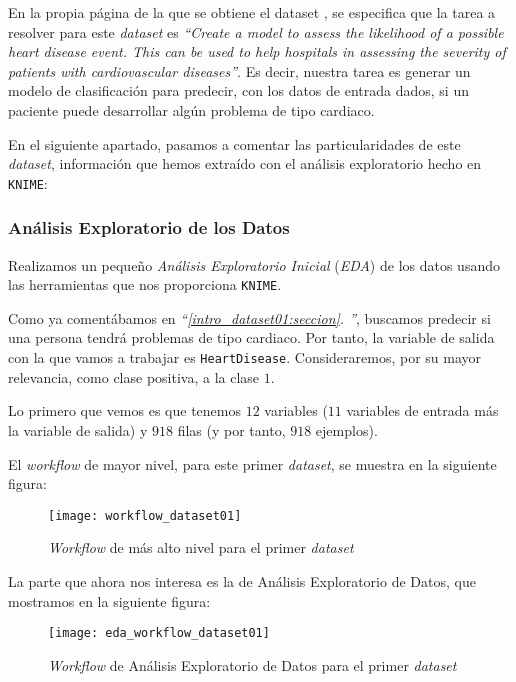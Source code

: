 \documentclass[11pt]{article}
\newcommand{\customcite}[1]{\emph{``\ref{#1}. \nameref{#1}''}}
\begin{document}
En la propia página de la que se obtiene el dataset \cite{heart_disease_dataset:online}, se especifica que la tarea a resolver para este \emph{dataset} es \emph{``Create a model to assess the likelihood of a possible heart disease event. This can be used to help hospitals in assessing the severity of patients with cardiovascular diseases''}. Es decir, nuestra tarea es generar un modelo de clasificación para predecir, con los datos de entrada dados, si un paciente puede desarrollar algún problema de tipo cardiaco.

En el siguiente apartado, pasamos a comentar las particularidades de este \emph{dataset}, información que hemos extraído con el análisis exploratorio hecho en \lstinline{KNIME}:

\subsubsection{Análisis Exploratorio de los Datos}

Realizamos un pequeño \emph{Análisis Exploratorio Inicial} (\emph{EDA}) de los datos usando las herramientas que nos proporciona \lstinline{KNIME}.

Como ya comentábamos en \customcite{intro_dataset01:seccion}, buscamos predecir si una persona tendrá problemas de tipo cardiaco. Por tanto, la variable de salida con la que vamos a trabajar es \lstinline{HeartDisease}. Consideraremos, por su mayor relevancia, como clase positiva, a la clase $1$.

Lo primero que vemos es que tenemos $12$ variables ($11$ variables de entrada más la variable de salida) y $918$ filas (y por tanto, $918$ ejemplos).

El \emph{workflow} de mayor nivel, para este primer \emph{dataset}, se muestra en la siguiente figura:

\begin{figure}[H]
    \centering
    \texttt{[image: workflow\_dataset01]}
    \caption{\emph{Workflow} de más alto nivel para el primer \emph{dataset}}
    \label{workflow_general:imagen}
\end{figure}

La parte que ahora nos interesa es la de Análisis Exploratorio de Datos, que mostramos en la siguiente figura:

\begin{figure}[H]
    \centering
    \texttt{[image: eda\_workflow\_dataset01]}
    \caption{\emph{Workflow} de Análisis Exploratorio de Datos para el primer \emph{dataset}}
\end{figure}
\end{document}
